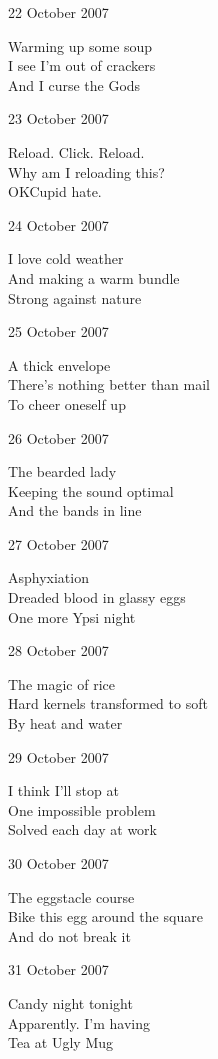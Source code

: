 \documentclass[12pt]{article}
\begin{document}
22 October 2007

Warming up some soup \\
I see I'm out of crackers \\
And I curse the Gods

23 October 2007

Reload. Click. Reload. \\
Why am I reloading this? \\
OKCupid hate.

24 October 2007

I love cold weather \\
And making a warm bundle \\
Strong against nature

\newpage

25 October 2007

A thick envelope \\
There's nothing better than mail \\
To cheer oneself up

26 October 2007

The bearded lady \\
Keeping the sound optimal \\
And the bands in line

27 October 2007

Asphyxiation \\
Dreaded blood in glassy eggs \\
One more Ypsi night

28 October 2007

The magic of rice \\
Hard kernels transformed to soft \\
By heat and water

29 October 2007

I think I'll stop at \\
One impossible problem \\
Solved each day at work

30 October 2007

The eggstacle course \\
Bike this egg around the square \\
And do not break it

31 October 2007

Candy night tonight \\
Apparently. I'm having \\
Tea at Ugly Mug


\newpage
\end{document}

